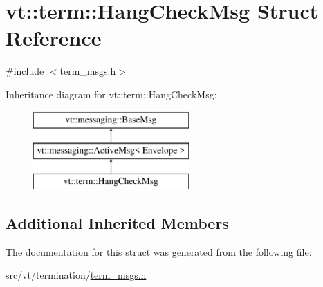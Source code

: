\hypertarget{structvt_1_1term_1_1_hang_check_msg}{}\section{vt\+:\+:term\+:\+:Hang\+Check\+Msg Struct Reference}
\label{structvt_1_1term_1_1_hang_check_msg}


{\ttfamily \#include $<$term\+\_\+msgs.\+h$>$}

Inheritance diagram for vt\+:\+:term\+:\+:Hang\+Check\+Msg\+:\begin{figure}[H]
\begin{center}
\leavevmode
\includegraphics[height=3.000000cm]{structvt_1_1term_1_1_hang_check_msg}
\end{center}
\end{figure}
\subsection*{Additional Inherited Members}


The documentation for this struct was generated from the following file\+:\begin{DoxyCompactItemize}
\item 
src/vt/termination/\hyperlink{term__msgs_8h}{term\+\_\+msgs.\+h}\end{DoxyCompactItemize}

